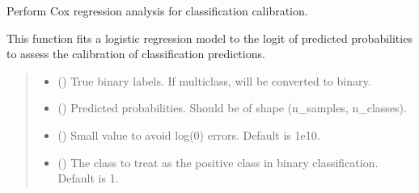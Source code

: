 \documentclass[letterpaper,10pt,english]{sphinxmanual}
\begin{document}
\begin{fulllineitems}
\label{\detokenize{calzone:calzone.metrics.cox_regression_analysis}}
\pysigstartsignatures
{}
\pysigstopsignatures
\sphinxAtStartPar
Perform Cox regression analysis for classification calibration.

\sphinxAtStartPar
This function fits a logistic regression model to the logit of predicted probabilities
to assess the calibration of classification predictions.
\begin{quote}\begin{description}
\begin{itemize}
\item {} 
\sphinxAtStartPar
{} () \textendash{} True binary labels. If multi\sphinxhyphen{}class, will be converted to binary.

\item {} 
\sphinxAtStartPar
{} () \textendash{} Predicted probabilities. Should be of shape (n\_samples, n\_classes).

\item {} 
\sphinxAtStartPar
{} () \textendash{} Small value to avoid log(0) errors. Default is 1e\sphinxhyphen{}10.

\item {} 
\sphinxAtStartPar
{} () \textendash{} The class to treat as the positive class in binary classification. Default is 1.


\end{itemize}
\end{description}
\end{quote}
\end{fulllineitems}
\end{document}
